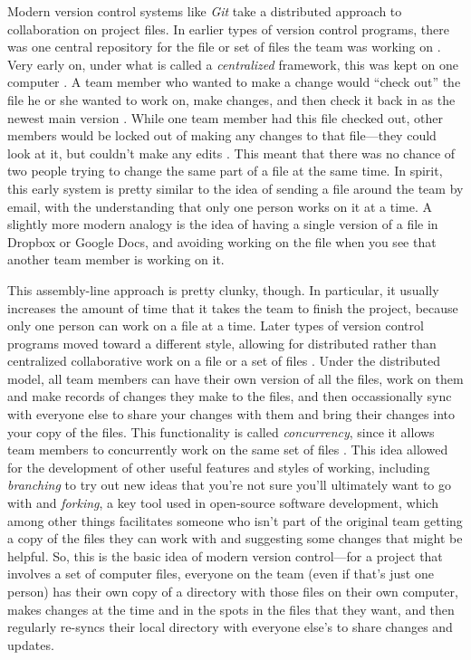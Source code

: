 \documentclass[]{tufte-book}
\begin{document}
Modern version control systems like \emph{Git} take a distributed approach to
collaboration on project files. In earlier types of version control programs,
there was one central repository for the file or set of files the team was
working on \citep{raymondunderstanding, target2018version}. Very early on, under
what is called a \emph{centralized} framework, this was kept on one
computer \citep{irving2011astonishments}. A team member who wanted to make a change
would ``check out'' the file he or she wanted to work on, make changes, and then
check it back in as the newest main version \citep{raymond2003art}. While one team
member had this file checked out, other members would be locked out of making
any changes to that file---they could look at it, but couldn't make any edits
\citep{raymondunderstanding, target2018version}. This meant that there was no chance
of two people trying to change the same part of a file at the same time. In
spirit, this early system is pretty similar to the idea of sending a file around
the team by email, with the understanding that only one person works on it at a
time. A slightly more modern analogy is the idea of having a single version of a
file in Dropbox or Google Docs, and avoiding working on the file when you see
that another team member is working on it.

This assembly-line approach is pretty clunky, though. In particular, it usually
increases the amount of time that it takes the team to finish the project,
because only one person can work on a file at a time. Later types of version
control programs moved toward a different style, allowing for distributed rather
than centralized collaborative work on a file or a set of files
\citep{raymondunderstanding, irving2011astonishments}. Under the distributed model,
all team members can have their own version of all the files, work on them and
make records of changes they make to the files, and then occassionally sync with
everyone else to share your changes with them and bring their changes into your
copy of the files. This functionality is called \emph{concurrency}, since it allows
team members to concurrently work on the same set of files
\citep{raymondunderstanding}. This idea allowed for the development of other useful
features and styles of working, including \emph{branching} to try out new ideas that
you're not sure you'll ultimately want to go with and \emph{forking}, a key tool used
in open-source software development, which among other things facilitates
someone who isn't part of the original team getting a copy of the files they can
work with and suggesting some changes that might be helpful. So, this is the
basic idea of modern version control---for a project that involves a set of
computer files, everyone on the team (even if that's just one person) has their
own copy of a directory with those files on their own computer, makes changes at
the time and in the spots in the files that they want, and then regularly
re-syncs their local directory with everyone else's to share changes and
updates.
\end{document}
